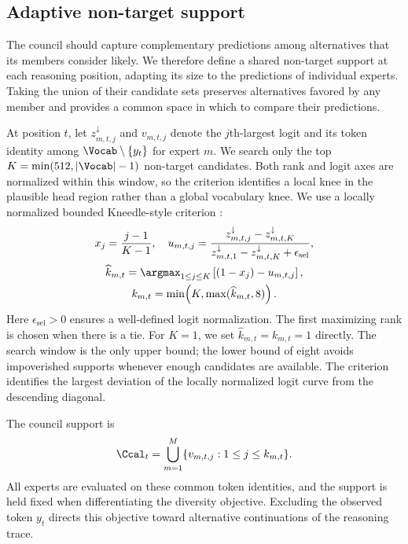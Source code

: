 
\subsection{Adaptive non-target support}
\label{sec:council}

The council should capture complementary predictions among alternatives that
its members consider likely. We therefore define a shared non-target support
at each reasoning position, adapting its size to the predictions of individual
experts. Taking the union of their candidate sets preserves alternatives
favored by any member and provides a common space in which to compare their
predictions.

At position $t$, let $z^{\downarrow}_{m,t,j}$ and $v_{m,t,j}$ denote the
$j$th-largest logit and its token identity among
$\Vocab\setminus\{y_t\}$ for expert $m$. We search only the top
$K=\min(512,|\Vocab|-1)$ non-target candidates. Both rank and logit axes
are normalized within this window, so the criterion identifies a local knee
in the plausible head region rather than a global vocabulary knee. We use
a locally normalized bounded Kneedle-style criterion
\citep{satopaa2011kneedle}:
\begin{equation}
\begin{gathered}
 x_j=\frac{j-1}{K-1},\quad
 u_{m,t,j}=\frac{z^{\downarrow}_{m,t,j}-z^{\downarrow}_{m,t,K}}
 {z^{\downarrow}_{m,t,1}-z^{\downarrow}_{m,t,K}+\epsilon_{\mathrm{sel}}},\\
 \widehat k_{m,t}=\argmax_{1\le j\le K}
       \left[(1-x_j)-u_{m,t,j}\right],\\
 k_{m,t}=\min\!\left(K,\max(\widehat k_{m,t},8)\right).
\end{gathered}
\label{eq:kneedle}
\end{equation}
Here $\epsilon_{\mathrm{sel}}>0$ ensures a well-defined logit normalization.
The first maximizing rank is chosen when there is a tie. For $K=1$, we set
$\widehat k_{m,t}=k_{m,t}=1$ directly. The search window is the only upper
bound; the lower bound of eight avoids impoverished supports whenever enough
candidates are available. The criterion identifies the largest deviation of
the locally normalized logit curve from the descending diagonal.

The council support is
\begin{equation}
 \Ccal_t=\bigcup_{m=1}^{M}
              \{v_{m,t,j}:1\le j\le k_{m,t}\}.
 \label{eq:stage1-support}
\end{equation}
All experts are evaluated on these common token identities, and the support
is held fixed when differentiating the diversity objective. Excluding the
observed token $y_t$ directs this objective toward alternative continuations
of the reasoning trace.

